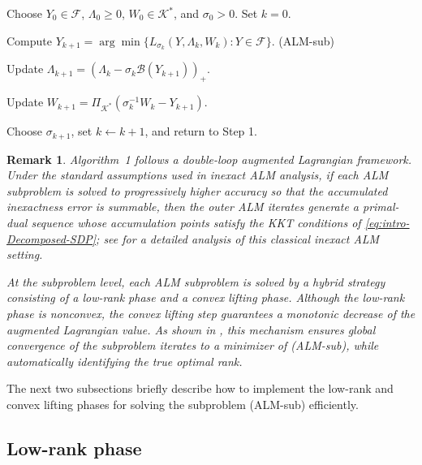 \documentclass[11pt]{article}
\def\B{\mathcal{B}}
\def\K{\mathcal{K}}
\def\F{\mathcal{F}}
\theoremstyle{plain}
\newtheorem{remark}{Remark}
\begin{document}
\begin{description}[itemsep=0pt]
\item[Algorithm 1:] Choose $Y_0\in \F$, $\Lambda_0\geq 0$, $W_0\in \K^*$, and $\sigma_0>0$. Set $k=0$.
\item[Step 1:] Compute $Y_{k+1}=\arg\min\{L_{\sigma_k}(Y,\Lambda_k,W_k): Y\in \F\}$. \hfill (ALM-sub)
\item[Step 2:] Update $\Lambda_{k+1}=(\Lambda_k-\sigma_k\B(Y_{k+1}))_+$.
\item[Step 3:] Update $W_{k+1}=\Pi_{\K^*}(\sigma_k^{-1}W_k-Y_{k+1})$.
\item[Step 4:] Choose $\sigma_{k+1}$, set $k\leftarrow k+1$, and return to Step 1.
\end{description}

\begin{remark}
Algorithm~1 follows a double-loop augmented Lagrangian framework. Under the standard assumptions used in inexact ALM analysis, if each ALM subproblem is solved to progressively higher accuracy so that the 
accumulated inexactness error is summable,
then the outer ALM iterates generate a primal-dual sequence whose accumulation points satisfy the KKT conditions of \eqref{eq:intro-Decomposed-SDP}; see \cite{RiNNAL} for a detailed analysis of this classical inexact ALM setting.

At the subproblem level, each ALM subproblem is solved by a hybrid strategy consisting of a low-rank phase and a convex lifting phase. Although the low-rank phase is nonconvex, the convex lifting step guarantees a monotonic decrease of the augmented Lagrangian value. As shown in \cite{lee2022escaping,RiNNALPOP}, this mechanism ensures global convergence of the subproblem iterates to a minimizer of (ALM-sub), while automatically identifying the true optimal rank.
\end{remark}

The next two subsections briefly describe how to implement the low-rank and convex lifting phases for solving the subproblem (ALM-sub) efficiently.





\subsection{Low-rank phase}\label{subsec:low-rank}
\end{document}
